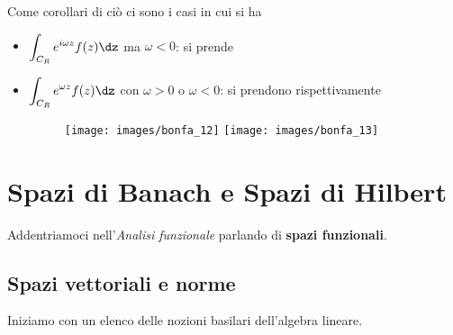 \newpage

Come corollari di ciò ci sono i casi in cui si ha
\begin{itemize}
    \item $\displaystyle\int_{C_R} e^{i\omega z}f(z)\dz$ ma $\omega<0$: si prende

    \item $\displaystyle\int_{C_R} e^{\omega z}f(z)\dz$ con $\omega>0$ o $\omega<0$: si prendono rispettivamente
    \begin{figure}[h!]
    \begin{center}
      \texttt{[image: images/bonfa\_12]}
      \texttt{[image: images/bonfa\_13]}
    \end{center}
    \end{figure}
\end{itemize}


\chapter{Spazi di Banach e Spazi di Hilbert}

Addentriamoci nell'\textit{Analisi funzionale} parlando di \textbf{spazi funzionali}.

\section{Spazi vettoriali e norme}

Iniziamo con un elenco delle nozioni basilari dell'algebra lineare.

